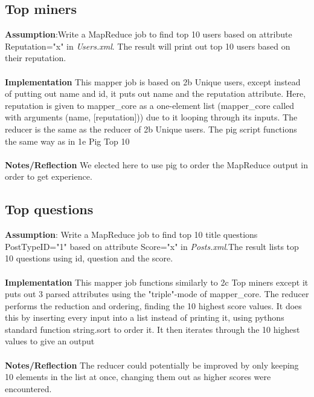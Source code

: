 \documentclass[fleqn,10pt]{wlscirep}
\begin{document}
\subsection{Top miners}
\textbf{Assumption}:Write a MapReduce job to find top 10 users based on attribute Reputation="x" in \textit{Users.xml}. The result will print out top 10 users based on their reputation. \\ \\
\textbf{Implementation} This mapper job is based on 2b Unique users, except instead of putting out name and id, it puts out name and the reputation attribute. Here, reputation is given to mapper\_core as a one-element list (mapper\_core called with arguments (name, [reputation])) due to it looping through its inputs. The reducer is the same as the reducer of 2b Unique users. The pig script functions the same way as in 1e Pig Top 10\\ \\
\textbf{Notes/Reflection} We elected here to use pig to order the MapReduce output in order to get experience.


\subsection{Top questions}
\textbf{Assumption}: Write a MapReduce job to find top 10 title questions PostTypeID="1"  based on attribute Score="x" in \textit{Posts.xml}.The result lists top 10 questions using id, question and the score.\\ \\
\textbf{Implementation} This mapper job functions similarly to 2c Top miners except it puts out 3 parsed attributes using the "triple"-mode of mapper\_core. The reducer performs the reduction and ordering, finding the 10 highest score values. It does this by inserting every input into a list instead of printing it, using pythons standard function string.sort to order it. It then iterates through the 10 highest values to give an output \\ \\
\textbf{Notes/Reflection} The reducer could potentially be improved by only keeping 10 elements in the list at once, changing them out as higher scores were encountered.

\end{document}

